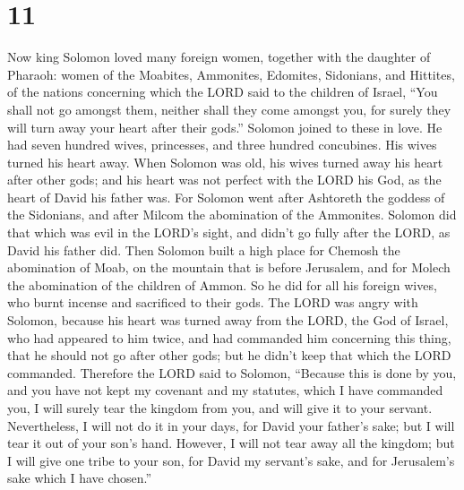 \hypertarget{section-10}{%
\section{11}\label{section-10}}

 Now king Solomon loved many foreign women, together with
the daughter of Pharaoh: women of the Moabites, Ammonites, Edomites,
Sidonians, and Hittites,  of the nations concerning which
the LORD said to the children of Israel, ``You shall not go amongst
them, neither shall they come amongst you, for surely they will turn
away your heart after their gods.'' Solomon joined to these in love.
 He had seven hundred wives, princesses, and three hundred
concubines. His wives turned his heart away.  When Solomon
was old, his wives turned away his heart after other gods; and his heart
was not perfect with the LORD his God, as the heart of David his father
was.  For Solomon went after Ashtoreth the goddess of the
Sidonians, and after Milcom the abomination of the Ammonites.
 Solomon did that which was evil in the LORD's sight, and
didn't go fully after the LORD, as David his father did. 
Then Solomon built a high place for Chemosh the abomination of Moab, on
the mountain that is before Jerusalem, and for Molech the abomination of
the children of Ammon.  So he did for all his foreign
wives, who burnt incense and sacrificed to their gods. 
The LORD was angry with Solomon, because his heart was turned away from
the LORD, the God of Israel, who had appeared to him twice,
 and had commanded him concerning this thing, that he
should not go after other gods; but he didn't keep that which the LORD
commanded.  Therefore the LORD said to Solomon, ``Because
this is done by you, and you have not kept my covenant and my statutes,
which I have commanded you, I will surely tear the kingdom from you, and
will give it to your servant.  Nevertheless, I will not
do it in your days, for David your father's sake; but I will tear it out
of your son's hand.  However, I will not tear away all
the kingdom; but I will give one tribe to your son, for David my
servant's sake, and for Jerusalem's sake which I have chosen.''

